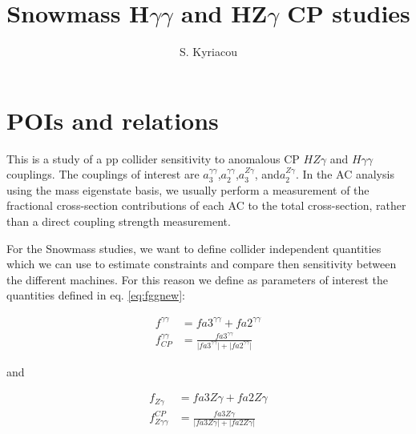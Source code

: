 \documentclass[10pt,a4paper]{article}
\title{Snowmass  H$\gamma\gamma$ and HZ$\gamma$ CP studies}
\author{S. Kyriacou}
\begin{document}
\maketitle

\section{POIs and relations}

This is a study of a pp collider sensitivity to anomalous CP  $HZ\gamma$ and $H\gamma\gamma$ couplings. 
The couplings of interest are $a_{3}^{\gamma\gamma}$,$a_{2}^{\gamma\gamma}$,$a_{3}^{Z\gamma}$, and$a_{2}^{Z\gamma}$. 
In the AC analysis using the mass eigenstate basis, we usually perform a measurement of the fractional cross-section contributions of each AC to the total cross-section, rather than a direct coupling strength measurement. 

For the Snowmass studies, we want to define collider independent quantities which we can use to estimate constraints and compare then sensitivity between the different machines. For this reason we define as parameters of interest the quantities defined in eq. \ref{eq:fggnew}: 

\begin{equation} \label{eq:fggnew}
\begin{aligned}
f^{\gamma\gamma} &= fa3^{\gamma\gamma} + fa2^{\gamma\gamma} \\
f^{\gamma\gamma}_{CP} &= \frac{fa3^{\gamma\gamma}}{\lvert fa3^{\gamma\gamma} \rvert + \lvert fa2^{\gamma\gamma} \rvert}
\end{aligned}
\end{equation}

and 

\begin{equation} \label{eq:fZgnew}
\begin{aligned}
f_{Z\gamma} &= fa3Z\gamma + fa2Z\gamma \\
f_{Z\gamma\gamma}^{CP} &= \frac{fa3Z\gamma}{\lvert fa3Z\gamma \rvert + \lvert fa2Z\gamma \rvert}
\end{aligned}
\end{equation}
\end{document}
